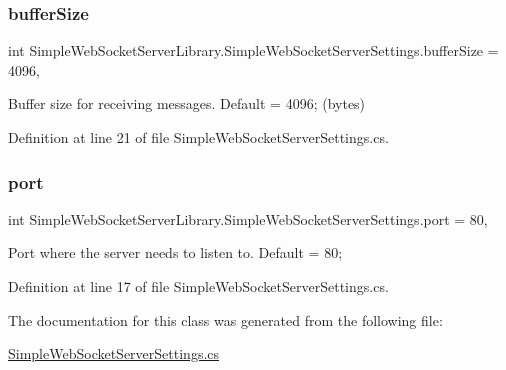 \subsubsection{\texorpdfstring{buffer\+Size}{bufferSize}}
{\footnotesize\ttfamily int Simple\+Web\+Socket\+Server\+Library.\+Simple\+Web\+Socket\+Server\+Settings.\+buffer\+Size = 4096\hspace{0.3cm}{\ttfamily [get]}, {\ttfamily [set]}}



Buffer size for receiving messages. Default = 4096; (bytes) 



Definition at line 21 of file Simple\+Web\+Socket\+Server\+Settings.\+cs.

\mbox{\label{class_simple_web_socket_server_library_1_1_simple_web_socket_server_settings_a58a8ef37b983c6697c5a33cd44992fcd}} 
\subsubsection{\texorpdfstring{port}{port}}
{\footnotesize\ttfamily int Simple\+Web\+Socket\+Server\+Library.\+Simple\+Web\+Socket\+Server\+Settings.\+port = 80\hspace{0.3cm}{\ttfamily [get]}, {\ttfamily [set]}}



Port where the server needs to listen to. Default = 80; 



Definition at line 17 of file Simple\+Web\+Socket\+Server\+Settings.\+cs.



The documentation for this class was generated from the following file\+:\begin{DoxyCompactItemize}
\item 
\mbox{\hyperlink{_simple_web_socket_server_settings_8cs}{Simple\+Web\+Socket\+Server\+Settings.\+cs}}\end{DoxyCompactItemize}
